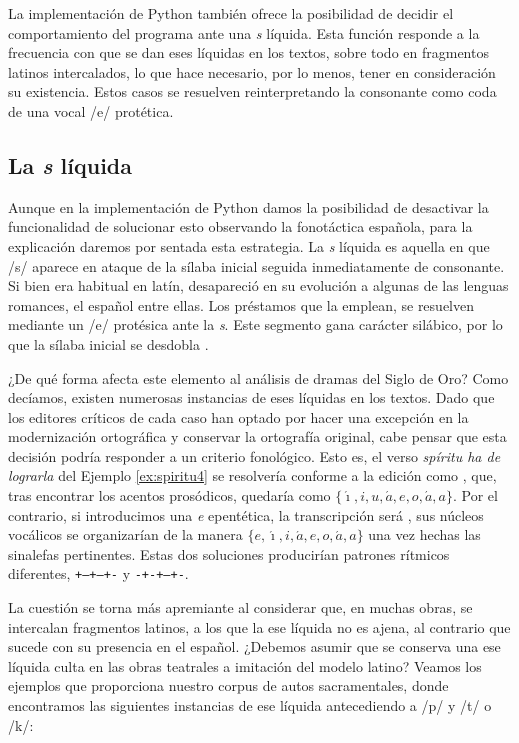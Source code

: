 La implementación de Python también ofrece la posibilidad de decidir el comportamiento del programa ante una \textit{s} líquida. Esta función responde a la frecuencia con que se dan eses líquidas en los textos, sobre todo en fragmentos latinos intercalados, lo que hace necesario, por lo menos, tener en consideración su existencia. Estos casos se resuelven reinterpretando la consonante como coda de una vocal /e/ protética.

\subsection{La \textit{s} líquida}
Aunque en la implementación de Python damos la posibilidad de desactivar la funcionalidad de solucionar esto observando la fonotáctica española, para la explicación daremos por sentada esta estrategia. La \textit{s} líquida es aquella en que /s/ aparece en ataque de la sílaba inicial seguida inmediatamente de consonante. Si bien era habitual en latín, desapareció en su evolución a algunas de las lenguas romances, el español entre ellas.  Los préstamos que la emplean, se resuelven mediante un /e/ protésica ante la \textit{s}. Este segmento gana carácter silábico, por lo que la sílaba inicial se desdobla \parencite[165]{claveria2018}.

¿De qué forma afecta este elemento al análisis de dramas del Siglo de Oro? Como decíamos, existen numerosas instancias de eses líquidas en los textos. Dado que los editores críticos de cada caso han optado por hacer una excepción en la modernización ortográfica y conservar la ortografía original, cabe pensar que esta decisión podría responder a un criterio fonológico.  Esto es, el verso \textit{spíritu ha de lograrla} del Ejemplo \ref{ex:spiritu4} se resolvería conforme a la edición como , que, tras encontrar los acentos prosódicos, quedaría como $\{\acute{\imath},i,u,\acute{a},e,o,\acute{a},a\}$. Por el contrario, si introducimos una \textit{e} epentética,  la transcripción será , sus núcleos vocálicos se organizarían de la manera $\{e,\acute{\imath},i,\acute{a},e,o,\acute{a},a\}$ una vez hechas las sinalefas pertinentes. Estas dos soluciones producirían patrones rítmicos diferentes, \texttt{+--+--+-} y \texttt{-+-+--+-}.

La cuestión se torna más apremiante al considerar que, en muchas obras, se intercalan fragmentos latinos, a los que la ese líquida no es ajena, al contrario que sucede con su presencia en el español. ¿Debemos asumir que se conserva una ese líquida culta en las obras teatrales a imitación del modelo latino? Veamos los ejemplos que proporciona nuestro corpus de autos sacramentales, donde encontramos las siguientes instancias de ese líquida antecediendo a /p/ y /t/ o /k/:

